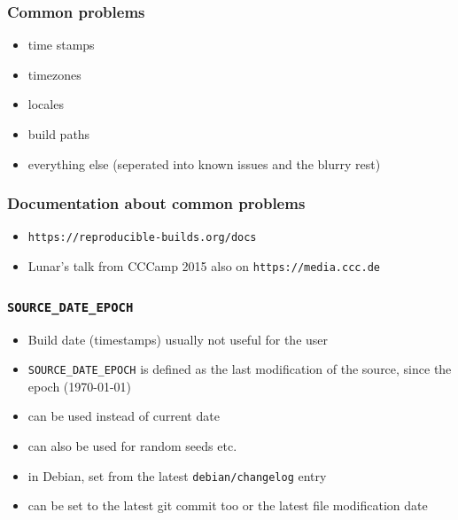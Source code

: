 \documentclass[14pt]{beamer}
\newif\ifplacelogo
\begin{document}
\placelogofalse

\begin{frame}
 \frametitle{Common problems}

 \begin{itemize}
  \item time stamps
  \item timezones
  \item locales
  \item build paths
  \item everything else (seperated into known issues and the blurry rest)
 \end{itemize}
\end{frame}

\begin{frame}
 \frametitle{Documentation about common problems}
 \begin{itemize}
  \item \texttt{https://reproducible-builds.org/docs}
  \item Lunar's talk from CCCamp 2015 also on
  \texttt{https://media.ccc.de}
 \end{itemize}
\end{frame}


\begin{frame}
 \frametitle{\texttt{SOURCE\_DATE\_EPOCH}}

 \begin{itemize}
  \item Build date (timestamps) usually not useful for the user
  \item \texttt{SOURCE\_DATE\_EPOCH} is defined as the last modification of
  the source, since the epoch (1970-01-01)
  \item can be used instead of current date
  \item can also be used for random seeds etc.
  \item in Debian, set from the latest \texttt{debian/changelog} entry
  \item can be set to the latest git commit too or the latest file
  modification date
 \end{itemize}
\end{frame}
\end{document}
